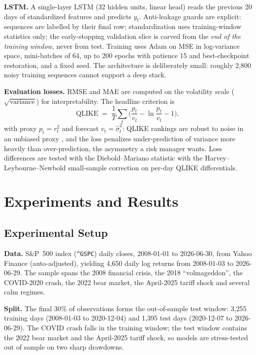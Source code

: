 \documentclass[a4paper,twocolumn,10pt]{article}
\begin{document}
\textbf{LSTM.} A single-layer LSTM (32 hidden units, linear head) reads the previous 20 days of standardized features and predicts $y_t$. Anti-leakage guards are explicit: sequences are labelled by their final row; standardization uses training-window statistics only; the early-stopping validation slice is carved from the \emph{end of the training window}, never from test. Training uses Adam on MSE in log-variance space, mini-batches of 64, up to 200 epochs with patience 15 and best-checkpoint restoration, and a fixed seed. The architecture is deliberately small: roughly 2{,}800 noisy training sequences cannot support a deep stack.

\textbf{Evaluation losses.} RMSE and MAE are computed on the volatility scale ($\sqrt{\text{variance}}$) for interpretability. The headline criterion is
\begin{equation}
\mathrm{QLIKE} \;=\; \frac{1}{T}\sum_{t}\Big(\frac{p_t}{v_t} - \ln\frac{p_t}{v_t} - 1\Big),
\label{eq:qlike}
\end{equation}
with proxy $p_t=r_t^2$ and forecast $v_t=\hat\sigma_t^2$: QLIKE rankings are robust to noise in an unbiased proxy \cite{patton2011}, and the loss penalizes under-prediction of variance more heavily than over-prediction, the asymmetry a risk manager wants. Loss differences are tested with the Diebold–Mariano statistic \cite{diebold1995} with the Harvey–Leybourne–Newbold small-sample correction \cite{harvey1997} on per-day QLIKE differentials.

\section{Experiments and Results}

\subsection{Experimental Setup}

\textbf{Data.} S\&P~500 index (\texttt{\^{}GSPC}) daily closes, 2008-01-01 to 2026-06-30, from Yahoo Finance (auto-adjusted), yielding 4{,}650 daily log returns from 2008-01-03 to 2026-06-29. The sample spans the 2008 financial crisis, the 2018 ``volmageddon'', the COVID-2020 crash, the 2022 bear market, the April-2025 tariff shock and several calm regimes.

\textbf{Split.} The final 30\% of observations forms the out-of-sample test window: 3{,}255 training days (2008-01-03 to 2020-12-04) and 1{,}395 test days (2020-12-07 to 2026-06-29). The COVID crash falls in the training window; the test window contains the 2022 bear market and the April-2025 tariff shock, so models are stress-tested out of sample on two sharp drawdowns.
\end{document}
